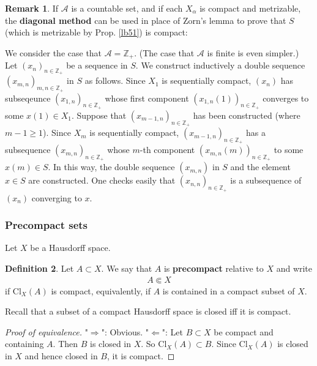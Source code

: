 \documentclass[12pt,b5paper,notitlepage]{article}
\theoremstyle{definition}
\newtheorem{df}{Definition}[subsection]
\newtheorem{rem}[df]{Remark}
\theoremstyle{plain}
\newcommand{\scr}{\mathscr}
\newcommand{\Zbb}{\mathbb Z}
\newcommand{\Cl}{\mathrm{Cl}}
\newcommand{\hqed}{\hfill\qedsymbol}
\numberwithin{equation}{section}
\begin{document}
\begin{rem}\label{lb52}
If $\scr A$ is a countable set, and if each $X_\alpha$ is compact and metrizable, the \textbf{diagonal method}  can be used in place of Zorn's lemma to prove that $S$ (which is metrizable by Prop. \ref{lb51}) is compact:

We consider the case that $\scr A=\Zbb_+$. (The case that $\scr A$ is finite is even simpler.) Let $(x_n)_{n\in\Zbb_+}$ be a sequence in $S$. We construct inductively a double sequence $(x_{m,n})_{m,n\in\Zbb_+}$ in $S$ as follows. Since $X_1$ is sequentially compact, $(x_n)$ has subseqeunce $(x_{1,n})_{n\in\Zbb_+}$ whose first component $(x_{1,n}(1))_{n\in\Zbb_+}$ converges to some $x(1)\in X_1$. Suppose that $(x_{m-1,n})_{n\in\Zbb_+}$ has been constructed (where $m-1\geq 1$). Since $X_m$ is sequentially compact, $(x_{m-1,n})_{n\in\Zbb_+}$ has a subsequence $(x_{m,n})_{n\in\Zbb_+}$ whose $m$-th component $(x_{m,n}(m))_{n\in\Zbb_+}$ to some $x(m)\in S$. In this way, the double sequence $(x_{m,n})$ in $S$ and the element $x\in S$ are constructed. One checks easily that $(x_{n,n})_{n\in\Zbb_+}$ is a subsequence of $(x_n)$ converging to $x$.  \hqed 
\end{rem}

















\subsubsection{Precompact sets}


Let $X$ be a Hausdorff space. 

\begin{df}
Let $A\subset X$. We say that $A$ is \textbf{precompact} relative to $X$ and write 
\begin{align*}
A\Subset X
\end{align*}
if $\Cl_X(A)$ is compact, equivalently, if $A$ is contained in a compact subset of $X$.
\end{df}

Recall that a subset of a compact Hausdorff space is closed iff it is compact.

\begin{proof}[Proof of equivalence]
"$\Rightarrow$": Obvious. "$\Leftarrow$": Let $B\subset X$ be compact and containing $A$. Then $B$ is closed in $X$. So $\Cl_X(A)\subset B$. Since $\Cl_X(A)$ is closed in $X$ and hence closed in $B$, it is compact.
\end{proof}
\end{document}
